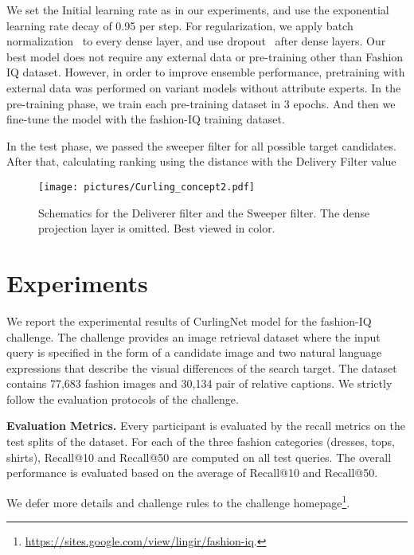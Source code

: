 \documentclass[10pt,twocolumn,letterpaper]{article}
\begin{document}
We set the Initial learning rate as  in our experiments, and use the exponential learning rate decay of 0.95 per step.
For regularization, we apply batch normalization~\cite{Sergey-icml-2015} to every dense layer, and use dropout~\cite{srivastava-jmlr-2014} after dense layers.
Our best model does not require any external data or pre-training other than Fashion IQ dataset. However, in order to improve ensemble performance, pretraining with external data was performed on variant models without attribute experts.
In the pre-training phase, we train each pre-training dataset in 3 epochs. And then we fine-tune the model with the fashion-IQ training dataset.  

In the test phase, we passed the sweeper filter for all possible target candidates. After that, calculating ranking using the distance with the Delivery Filter value

\begin{figure}[t]
\centering
\texttt{[image: pictures/Curling\_concept2.pdf]}
\caption{
Schematics for the Deliverer filter and the Sweeper filter. The dense projection layer is omitted. Best viewed in color.
}
\label{fig:filter_detail}
\end{figure}




\section{Experiments}
\label{sec:experiments}

We report the experimental results of CurlingNet model for the fashion-IQ challenge.
The challenge provides an image retrieval dataset where the input query is specified in the form of a candidate image and two natural language expressions that describe the visual differences of the search target.
The dataset contains 77,683 fashion images and 30,134 pair of relative captions.
We strictly follow the evaluation protocols of the challenge.

\textbf{Evaluation Metrics.}
Every participant is evaluated by the recall metrics on the test splits of the dataset. 
For each of the three fashion categories (dresses, tops, shirts), Recall@10 and Recall@50 are computed on all test queries.
The overall performance is evaluated based on the average of Recall@10 and Recall@50. 

We defer more details and challenge rules to the challenge homepage\footnote{\url{https://sites.google.com/view/lingir/fashion-iq}.}.
\end{document}
